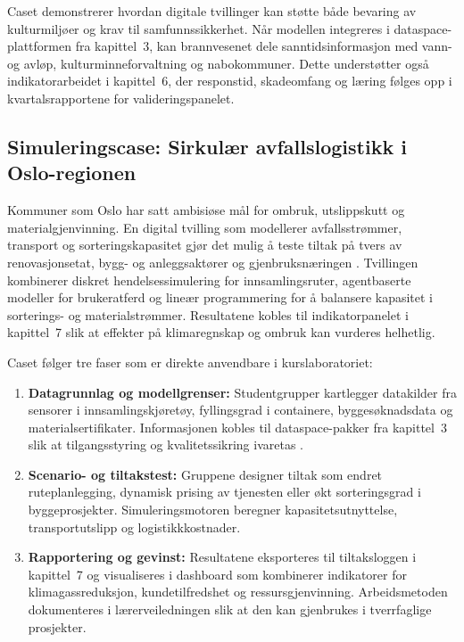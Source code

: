 Caset demonstrerer hvordan digitale tvillinger kan støtte både bevaring av kulturmiljøer og krav til samfunnssikkerhet. Når modellen integreres i dataspace-plattformen fra kapittel~3, kan brannvesenet dele sanntidsinformasjon med vann- og avløp, kulturminneforvaltning og nabokommuner. Dette understøtter også indikatorarbeidet i kapittel~6, der responstid, skadeomfang og læring følges opp i kvartalsrapportene for valideringspanelet.

\subsection{Simuleringscase: Sirkulær avfallslogistikk i Oslo-regionen}
Kommuner som Oslo har satt ambisiøse mål for ombruk, utslippskutt og materialgjenvinning. En digital tvilling som modellerer avfallsstrømmer, transport og sorteringskapasitet gjør det mulig å teste tiltak på tvers av renovasjonsetat, bygg- og anleggsaktører og gjenbruksnæringen \citep{oslo2023sirkularstrategi,ren2024ressursdataplattform}. Tvillingen kombinerer diskret hendelsessimulering for innsamlingsruter, agentbaserte modeller for brukeratferd og lineær programmering for å balansere kapasitet i sorterings- og materialstrømmer. Resultatene kobles til indikatorpanelet i kapittel~7 slik at effekter på klimaregnskap og ombruk kan vurderes helhetlig.

Caset følger tre faser som er direkte anvendbare i kurslaboratoriet:
\begin{enumerate}
    \item \textbf{Datagrunnlag og modellgrenser:} Studentgrupper kartlegger datakilder fra sensorer i innsamlingskjøretøy, fyllingsgrad i containere, byggesøknadsdata og materialsertifikater. Informasjonen kobles til dataspace-pakker fra kapittel~3 slik at tilgangsstyring og kvalitetssikring ivaretas \citep{norsus2022materialflyt}.
    \item \textbf{Scenario- og tiltakstest:} Gruppene designer tiltak som endret ruteplanlegging, dynamisk prising av tjenesten eller økt sorteringsgrad i byggeprosjekter. Simuleringsmotoren beregner kapasitetsutnyttelse, transportutslipp og logistikkkostnader.
    \item \textbf{Rapportering og gevinst:} Resultatene eksporteres til tiltaksloggen i kapittel~7 og visualiseres i dashboard som kombinerer indikatorer for klimagassreduksjon, kundetilfredshet og ressursgjenvinning. Arbeidsmetoden dokumenteres i lærerveiledningen slik at den kan gjenbrukes i tverrfaglige prosjekter.
\end{enumerate}

